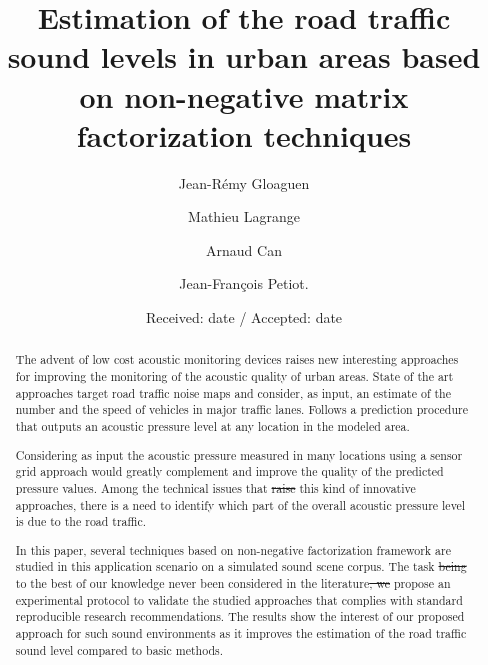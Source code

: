 \documentclass[twocolumn]{svjour3}          %
\providecommand{\DIFaddtex}[1]{{\protect\color{blue}\uwave{#1}}} %
\providecommand{\DIFdeltex}[1]{{\protect\color{red}\sout{#1}}}                      %
\providecommand{\DIFaddbegin}{} %
\providecommand{\DIFaddend}{} %
\providecommand{\DIFdelbegin}{} %
\providecommand{\DIFdelend}{} %
\providecommand{\DIFadd}[1]{\texorpdfstring{\DIFaddtex{#1}}{#1}} %
\providecommand{\DIFdel}[1]{\texorpdfstring{\DIFdeltex{#1}}{}} %
\begin{document}
\title{Estimation of the road traffic sound levels in urban areas based on non-negative matrix factorization techniques}

\author{Jean-R\'emy Gloaguen         \and
		Mathieu Lagrange \and
		Arnaud Can \and
		Jean-Fran\c cois Petiot.}


\date{Received: date / Accepted: date}


\maketitle

\begin{abstract}
The advent of low cost acoustic monitoring devices raises new interesting approaches for improving the monitoring of the acoustic quality of urban areas. State of the art approaches target road traffic noise maps and consider, as input, an estimate of the number and the speed of vehicles in major traffic lanes. Follows a prediction procedure that outputs an acoustic pressure level at any location in the modeled area.

Considering as input the acoustic pressure measured in many locations using a sensor grid approach would greatly complement and improve the quality of the predicted pressure values. Among the technical issues that \DIFdelbegin \DIFdel{raise }\DIFdelend \DIFaddbegin \DIFadd{bring }\DIFaddend this kind of innovative approaches, there is a need to identify which part of the overall acoustic pressure level is due to the road traffic.

In this paper, several techniques based on non-negative \DIFaddbegin \DIFadd{matrix  }\DIFaddend factorization framework are studied in this application scenario on a simulated sound scene corpus. The task \DIFdelbegin \DIFdel{being }\DIFdelend \DIFaddbegin \DIFadd{is }\DIFaddend to the best of our knowledge never been considered in the literature\DIFdelbegin \DIFdel{, we }\DIFdelend \DIFaddbegin \DIFadd{. We }\DIFaddend propose an experimental protocol to validate the studied approaches that complies with standard reproducible research recommendations. The results show the interest of our proposed approach for such sound environments as it improves the estimation of the road traffic sound level compared to basic methods.

\end{abstract}
\end{document}
